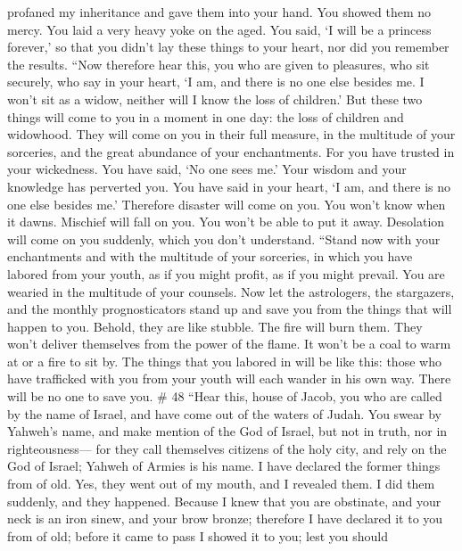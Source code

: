 profaned my inheritance and gave them into your hand. You showed them no
mercy. You laid a very heavy yoke on the aged.  You said,
`I will be a princess forever,' so that you didn't lay these things to
your heart, nor did you remember the results.  ``Now
therefore hear this, you who are given to pleasures, who sit securely,
who say in your heart, `I am, and there is no one else besides me. I
won't sit as a widow, neither will I know the loss of children.'
 But these two things will come to you in a moment in one
day: the loss of children and widowhood. They will come on you in their
full measure, in the multitude of your sorceries, and the great
abundance of your enchantments.  For you have trusted in
your wickedness. You have said, `No one sees me.' Your wisdom and your
knowledge has perverted you. You have said in your heart, `I am, and
there is no one else besides me.'  Therefore disaster
will come on you. You won't know when it dawns. Mischief will fall on
you. You won't be able to put it away. Desolation will come on you
suddenly, which you don't understand.  ``Stand now with
your enchantments and with the multitude of your sorceries, in which you
have labored from your youth, as if you might profit, as if you might
prevail.  You are wearied in the multitude of your
counsels. Now let the astrologers, the stargazers, and the monthly
prognosticators stand up and save you from the things that will happen
to you.  Behold, they are like stubble. The fire will
burn them. They won't deliver themselves from the power of the flame. It
won't be a coal to warm at or a fire to sit by.  The
things that you labored in will be like this: those who have trafficked
with you from your youth will each wander in his own way. There will be
no one to save you. \# 48  ``Hear this, house of Jacob,
you who are called by the name of Israel, and have come out of the
waters of Judah. You swear by Yahweh's name, and make mention of the God
of Israel, but not in truth, nor in righteousness---  for
they call themselves citizens of the holy city, and rely on the God of
Israel; Yahweh of Armies is his name.  I have declared the
former things from of old. Yes, they went out of my mouth, and I
revealed them. I did them suddenly, and they happened. 
Because I knew that you are obstinate, and your neck is an iron sinew,
and your brow bronze;  therefore I have declared it to you
from of old; before it came to pass I showed it to you; lest you should
